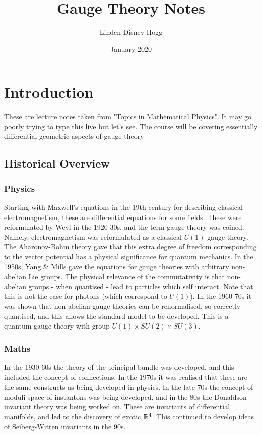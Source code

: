 \documentclass{article}
\title{Gauge Theory Notes}
\author{Linden Disney-Hogg}
\date{January 2020}
\begin{document}
\maketitle
\tableofcontents

\section{Introduction}
These are lecture notes taken from "Topics in Mathematical Physics". It may go poorly trying to type this live but let's see. The course will be covering essentially differential geometric aspects of gauge theory
\subsection{Historical Overview}
\subsubsection{Physics}
Starting with Maxwell's equations in the 19th century for describing classical electromagnetism, these are differential equations for some fields. These were reformulated by Weyl in the 1920-30s, and the term gauge theory was coined. Namely, electromagnetism was reformulated as a classical $U(1)$ gauge theory. The Aharonov-Bohm theory gave that this extra degree of freedom corresponding to the vector potential has a physical significance for quantum mechanics. In the 1950s, Yang \& Mills gave the equations for gauge theories with arbitrary non-abelian Lie groups. The physical relevance of the commutativity is that non-abelian groups - when quantised - lead to particles which self interact. Note that this is not the case for photons (which correspond to $U(1)$). In the 1960-70s it was shown that non-abelian gauge theories can be renormalised, so correctly quantised, and this allows the standard model to be developed. This is a quantum gauge theory with group $U(1)\times SU(2) \times SU(3)$.

\subsubsection{Maths}
In the 1930-60s the theory of the principal bundle was developed, and this included the concept of connections. In the 1970s it was realised that these are the same constructs as being developed in physics. In the late 70s the concept of moduli space of instantons was being developed, and in the 80s the Donaldson invariant theory was being worked on. These are invariants of differential manifolds, and led to the discovery of exotic $\mathbb{R}^4$. This continued to develop ideas of Seiberg-Witten invariants in the 90s. 
\end{document}
